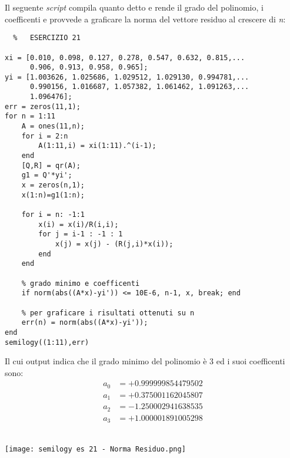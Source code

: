 \documentclass[a4paper]{report}
\begin{document}
Il seguente \emph{script} compila quanto detto e rende il grado del polinomio, i coefficenti e provvede a graficare la norma del vettore residuo al crescere di \emph{n}:\\
\begin{lstlisting}	%	ESERCIZIO 21

xi = [0.010, 0.098, 0.127, 0.278, 0.547, 0.632, 0.815,...
      0.906, 0.913, 0.958, 0.965];
yi = [1.003626, 1.025686, 1.029512, 1.029130, 0.994781,...
      0.990156, 1.016687, 1.057382, 1.061462, 1.091263,...
      1.096476];
err = zeros(11,1);
for n = 1:11
	A = ones(11,n);
	for i = 2:n
		A(1:11,i) = xi(1:11).^(i-1);
	end
	[Q,R] = qr(A);
	g1 = Q'*yi';
	x = zeros(n,1);
	x(1:n)=g1(1:n);

	for i = n: -1:1
		x(i) = x(i)/R(i,i);
		for j = i-1 : -1 : 1
			x(j) = x(j) - (R(j,i)*x(i)); 
		end 
	end
	
	% grado minimo e coefficenti
	if norm(abs((A*x)-yi')) <= 10E-6, n-1, x, break; end

	% per graficare i risultati ottenuti su n
	err(n) = norm(abs((A*x)-yi'));
end
semilogy((1:11),err)
\end{lstlisting}
\newpage
Il cui output indica che il grado minimo del polinomio è 3 ed i suoi coefficenti sono:\\
\[
\begin{aligned}
a_0 &= + 0.999999854479502\\
a_1 &= + 0.375001162045807\\
a_2 &= - 1.250002941638535\\
a_3 &= + 1.000001891005298
\end{aligned}
\]
\\
\begin{center}	%
	\texttt{[image: semilogy es 21 - Norma Residuo.png]}
\end{center}
\newpage
\end{document}
